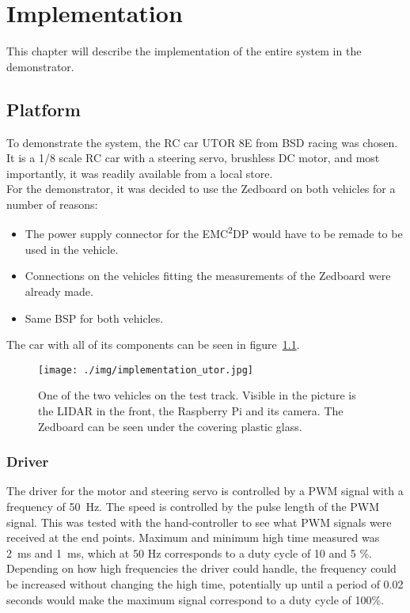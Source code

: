 \chapter{Implementation}
This chapter will describe the implementation of the entire system in the demonstrator.

\section{Platform}
To demonstrate the system, the RC car UTOR 8E from BSD racing was chosen. It is a 1/8 scale RC car with a steering servo, brushless DC motor, and most importantly, it was readily available from a local store.\\

For the demonstrator, it was decided to use the Zedboard on both vehicles for a number of reasons:
\begin{itemize}
\item The power supply connector for the EMC\textsuperscript{2}DP would have to be remade to be used in the vehicle.
\item Connections on the vehicles fitting the measurements of the Zedboard were already made.
\item Same BSP for both vehicles.
\end{itemize}

The car with all of its components can be seen in figure~\ref{fig:utor_overview}.

\begin{figure}[H]
\centering
\texttt{[image: ./img/implementation\_utor.jpg]}
\caption{One of the two vehicles on the test track. Visible in the picture is the LIDAR in the front, the Raspberry Pi and its camera. The Zedboard can be seen under the covering plastic glass.}
\label{fig:utor_overview}
\end{figure}

\subsection{Driver}
The driver for the motor and steering servo is controlled by a PWM signal with a frequency of 50~Hz. The speed is controlled by the pulse length of the PWM signal. This was tested with the hand-controller to see what PWM signals were received at the end points. Maximum and minimum high time measured was 2~ms and 1~ms, which at 50 Hz corresponds to a duty cycle of 10 and 5 \%. Depending on how high frequencies the driver could handle, the frequency could be increased without changing the high time, potentially up until a period of 0.02 seconds would make the maximum signal correspond to a duty cycle of 100\%.\\

